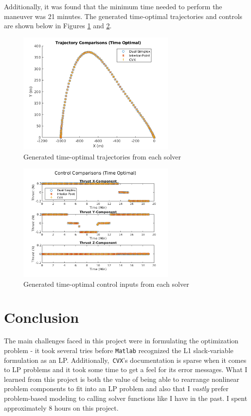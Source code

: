 \documentclass{article}
\begin{document}
Additionally, it was found that the minimum time needed to perform the maneuver was 21 minutes.
The generated time-optimal trajectories and controls are shown below in Figures \ref{fig:trajectories-time} and \ref{fig:controls-time}.

\begin{figure}[H]
  \centering
  \includegraphics[width=0.7\textwidth]{images/trajectories_time.png}
  \caption{Generated time-optimal trajectories from each solver}
  \label{fig:trajectories-time}
\end{figure}

\begin{figure}[H]
  \centering
  \includegraphics[width=0.7\textwidth]{images/controls_time.png}
  \caption{Generated time-optimal control inputs from each solver}
  \label{fig:controls-time}
\end{figure}

\section*{Conclusion}

The main challenges faced in this project were in formulating the optimization problem - it took several tries before \texttt{Matlab} recognized the L1 slack-variable formulation as an LP.
Additionally,\texttt{ CVX}'s documentation is sparse when it comes to LP problems and it took some time to get a feel for its error messages.
What I learned from this project is both the value of being able to rearrange nonlinear problem components to fit into an LP problem and also that I \textit{vastly} prefer problem-based modeling to calling solver functions like I have in the past.
I spent approximately 8 hours on this project.
\end{document}
